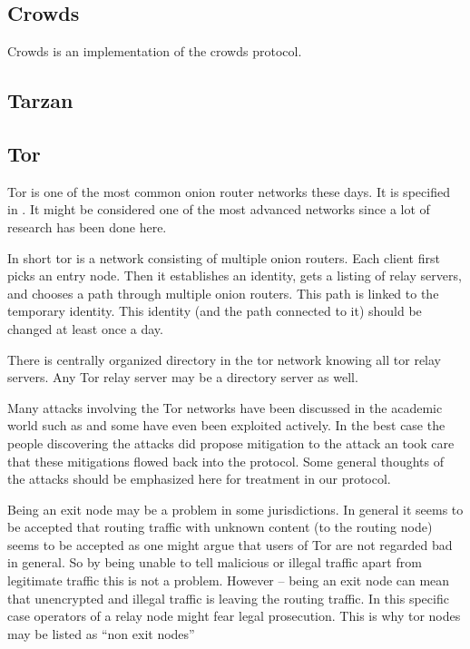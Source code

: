 \subsection{Crowds}
Crowds is an implementation of the crowds protocol.


\subsection{Tarzan}

\subsection{Tor\label{sec:tor}}
Tor is one of the most common onion router networks these days. It is specified in \cite{tor-spec}. It might be considered  one of the most advanced networks since a lot of research has been done here.

In short tor is a network consisting of multiple onion routers. Each client first picks an entry node. Then it establishes an identity, gets a listing of relay servers, and chooses a path through multiple onion routers. This path is linked to the temporary identity. This identity (and the path connected to it) should be changed at least once a day. 

There is centrally organized directory in the tor network knowing all tor relay servers. Any Tor relay server may be a directory server as well.

Many attacks involving the Tor networks have been discussed in the academic world such as \cite{hs-attack06,esorics13-cellflood,bauer:wpes2007,esorics12-torscan,oakland2013-trawling,danner-et-al:tissec12,congestion-longpaths} and some have even been exploited actively. In the best case the people discovering the attacks did propose mitigation to the attack an took care that these mitigations flowed back into the protocol. Some general thoughts of the attacks should be emphasized here for treatment in our protocol.

Being an exit node may be a problem in some jurisdictions. In general it seems to be accepted that routing traffic with unknown content (to the routing node) seems to be accepted as one might argue that users of Tor are not regarded bad in general. So by being unable to tell malicious or illegal traffic apart from legitimate traffic this is not a problem. However -- being an exit node can mean that unencrypted and illegal traffic is leaving the routing traffic. In this specific case operators of a relay node might fear legal prosecution. This is why tor nodes may be listed as ``non exit nodes'' 

